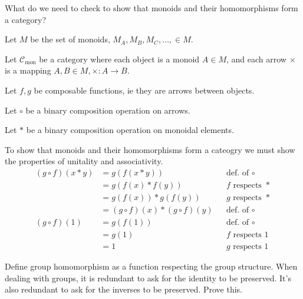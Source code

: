 \begin{ttta}
What do we need to check to show that monoids and their homomorphisms form a
category?
\end{ttta}
\begin{proofitem}
\item Let $M$ be the set of monoids, $M_A, M_B, M_C, \ldots, \in M$.
\item Let $\mathcal{C}_\text{mon}$ be a category where each object is a monoid
    $A\in M$, and each arrow $\times$ is a mapping $A,B \in M, \times:
    A\rightarrow B$.
\item Let $f, g$ be composable functions, ie they are arrows between objects.
\item Let $\circ$ be a binary composition operation on arrows.
\item Let $\ast$ be a binary composition operation on monoidal elements.
\item To show that monoids and their homomorphisms form a cateogry we must show
    the properties of unitality and associativity.
\setcounter{equation}{0}
\begin{align}
    (g\circ f)(x\ast y) &= g(f(x\ast y)) && \text{def. of }\circ\\
    &= g(f(x) \ast f(y)) && f\text{ respects }\ast\\
    &= g(f(x)) \ast g(f(y)) && g\text{ respects }\ast\\
    &= (g\circ f)(x) \ast (g\circ f)(y) && \text{def. of }\circ\\
    (g\circ f)(1)&= g(f(1)) && \text{def. of }\circ\\
    &= g(1) && f \text{ respects }1\\
    &= 1 && g \text{ respects }1
\end{align}
\end{proofitem}

\begin{ttta}
Define group homomorphism as a function respecting the group structure. When
dealing with groups, it is redundant to ask for the identity to be preserved.
It’s also redundant to ask for the inverses to be preserved. Prove this.
\end{ttta}
